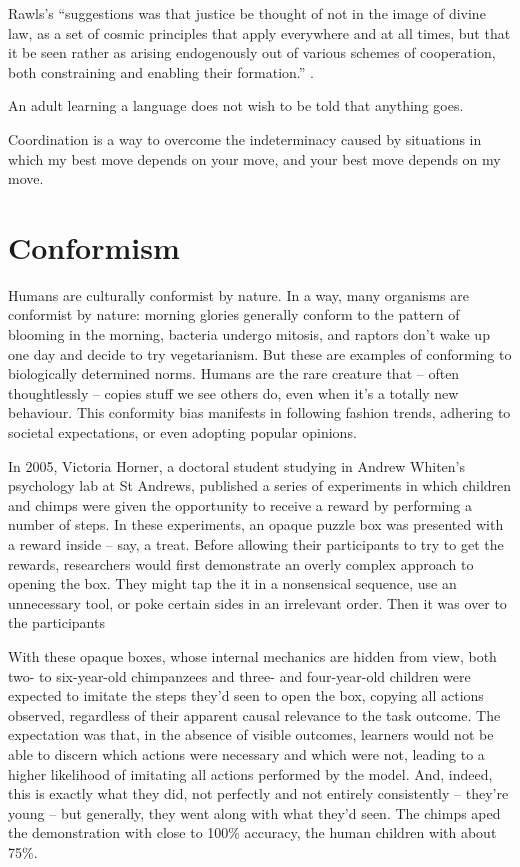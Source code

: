 \newpage
Rawls's ``suggestions was that justice be thought of not in the image of divine law, as a set of cosmic principles that apply everywhere and at all times, but that it be seen rather as arising endogenously out of various schemes of cooperation, both constraining and enabling their formation.'' \citep[7]{Heath2022}.

An adult learning a language does not wish to be told that anything goes. 

Coordination is a way to overcome the indeterminacy caused by situations in which my best move depends on your move, and your best move depends on my move.

\section{Conformism}
Humans are culturally conformist by nature. In a way, many organisms are conformist by nature: morning glories generally conform to the pattern of blooming in the morning, bacteria undergo mitosis, and raptors don't wake up one day and decide to try vegetarianism. But these are examples of conforming to biologically determined norms. Humans are the rare creature that -- often thoughtlessly -- copies stuff we see others do, even when it's a totally new behaviour. This conformity bias manifests in following fashion trends, adhering to societal expectations, or even adopting popular opinions.

In 2005, Victoria Horner, a doctoral student studying in Andrew Whiten's psychology lab at St Andrews, published a series of experiments in which children and chimps were given the opportunity to receive a reward by performing a number of steps. In these experiments, an opaque puzzle box was presented with a reward inside -- say, a treat. Before allowing their participants to try to get the rewards, researchers would first demonstrate an overly complex approach to opening the box. They might tap the it in a nonsensical sequence, use an unnecessary tool, or poke certain sides in an irrelevant order. Then it was over to the participants

With these opaque boxes, whose internal mechanics are hidden from view, both two- to six-year-old chimpanzees and three- and four-year-old children were expected to imitate the steps they'd seen to open the box, copying all actions observed, regardless of their apparent causal relevance to the task outcome. The expectation was that, in the absence of visible outcomes, learners would not be able to discern which actions were necessary and which were not, leading to a higher likelihood of imitating all actions performed by the model. And, indeed, this is exactly what they did, not perfectly and not entirely consistently -- they're young -- but generally, they went along with what they'd seen. The chimps aped the demonstration with close to 100\% accuracy, the human children with about 75\%.

